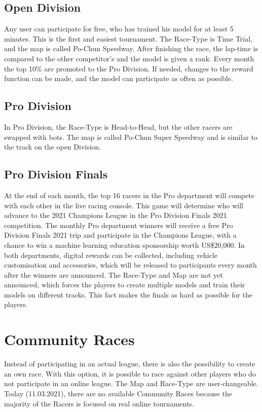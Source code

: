 \subsection{Open Division}
Any user can participate for free, who has trained his model for at least 5 minutes. This is the first and easiest tournament. The Race-Type is Time Trial, and the map is called Po-Chun Speedway. After finishing the race, the lap-time is compared to the other competitor's and the model is given a rank. Every month the top 10\% are promoted to the Pro Division. If needed, changes to the reward function can be made, and the model can participate as often as possible. 

\subsection{Pro Division}
In Pro Division, the Race-Type is Head-to-Head, but the other racers are swapped with bots. The map is called Po-Chun Super Speedway and is similar to the track on the open Division. 


\subsection{Pro Division Finals}
At the end of each month, the top 16 racers in the Pro department will compete with each other in the live racing console. This game will determine who will advance to the 2021 Champions League in the Pro Division Finals 2021 competition. The monthly Pro department winners will receive a free Pro Division Finals 2021 trip and participate in the Champions League, with a chance to win a machine learning education sponsorship worth US\$20,000. In both departments, digital rewards can be collected, including vehicle customisation and accessories, which will be released to participants every month after the winners are announced.
The Race-Type and Map are not yet announced, which forces the players to create multiple models and train their models on different tracks. This fact makes the finals as hard as possible for the players.  

\section{Community Races}
Instead of participating in an actual league, there is also the possibility to create an own race. With this option, it is possible to race against other players who do not participate in an online league. The Map and Race-Type are user-changeable. Today (11.03.2021), there are no available Community Races because the majority of the Racers is focused on real online tournaments.

